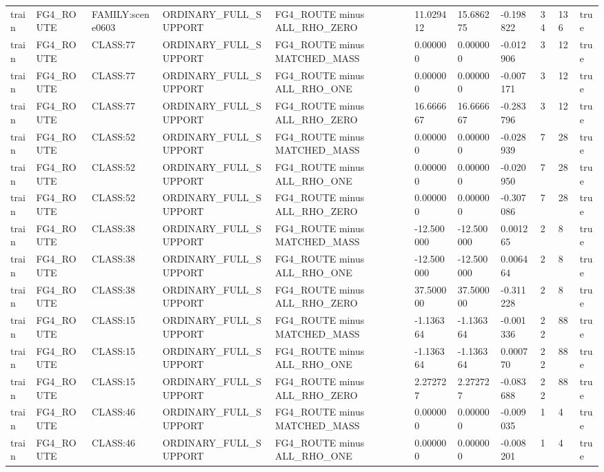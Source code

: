 \begin{tabular}{lllllllllll}
train & FG4\_ROUTE & FAMILY:scene0603 & ORDINARY\_FULL\_SUPPORT & FG4\_ROUTE minus ALL\_RHO\_ZERO & 11.029412 & 15.686275 & -0.198822 & 34 & 136 & true \\
train & FG4\_ROUTE & CLASS:77 & ORDINARY\_FULL\_SUPPORT & FG4\_ROUTE minus MATCHED\_MASS & 0.000000 & 0.000000 & -0.012906 & 3 & 12 & true \\
train & FG4\_ROUTE & CLASS:77 & ORDINARY\_FULL\_SUPPORT & FG4\_ROUTE minus ALL\_RHO\_ONE & 0.000000 & 0.000000 & -0.007171 & 3 & 12 & true \\
train & FG4\_ROUTE & CLASS:77 & ORDINARY\_FULL\_SUPPORT & FG4\_ROUTE minus ALL\_RHO\_ZERO & 16.666667 & 16.666667 & -0.283796 & 3 & 12 & true \\
train & FG4\_ROUTE & CLASS:52 & ORDINARY\_FULL\_SUPPORT & FG4\_ROUTE minus MATCHED\_MASS & 0.000000 & 0.000000 & -0.028939 & 7 & 28 & true \\
train & FG4\_ROUTE & CLASS:52 & ORDINARY\_FULL\_SUPPORT & FG4\_ROUTE minus ALL\_RHO\_ONE & 0.000000 & 0.000000 & -0.020950 & 7 & 28 & true \\
train & FG4\_ROUTE & CLASS:52 & ORDINARY\_FULL\_SUPPORT & FG4\_ROUTE minus ALL\_RHO\_ZERO & 0.000000 & 0.000000 & -0.307086 & 7 & 28 & true \\
train & FG4\_ROUTE & CLASS:38 & ORDINARY\_FULL\_SUPPORT & FG4\_ROUTE minus MATCHED\_MASS & -12.500000 & -12.500000 & 0.001265 & 2 & 8 & true \\
train & FG4\_ROUTE & CLASS:38 & ORDINARY\_FULL\_SUPPORT & FG4\_ROUTE minus ALL\_RHO\_ONE & -12.500000 & -12.500000 & 0.006464 & 2 & 8 & true \\
train & FG4\_ROUTE & CLASS:38 & ORDINARY\_FULL\_SUPPORT & FG4\_ROUTE minus ALL\_RHO\_ZERO & 37.500000 & 37.500000 & -0.311228 & 2 & 8 & true \\
train & FG4\_ROUTE & CLASS:15 & ORDINARY\_FULL\_SUPPORT & FG4\_ROUTE minus MATCHED\_MASS & -1.136364 & -1.136364 & -0.001336 & 22 & 88 & true \\
train & FG4\_ROUTE & CLASS:15 & ORDINARY\_FULL\_SUPPORT & FG4\_ROUTE minus ALL\_RHO\_ONE & -1.136364 & -1.136364 & 0.000770 & 22 & 88 & true \\
train & FG4\_ROUTE & CLASS:15 & ORDINARY\_FULL\_SUPPORT & FG4\_ROUTE minus ALL\_RHO\_ZERO & 2.272727 & 2.272727 & -0.083688 & 22 & 88 & true \\
train & FG4\_ROUTE & CLASS:46 & ORDINARY\_FULL\_SUPPORT & FG4\_ROUTE minus MATCHED\_MASS & 0.000000 & 0.000000 & -0.009035 & 1 & 4 & true \\
train & FG4\_ROUTE & CLASS:46 & ORDINARY\_FULL\_SUPPORT & FG4\_ROUTE minus ALL\_RHO\_ONE & 0.000000 & 0.000000 & -0.008201 & 1 & 4 & true \\

\end{tabular}
